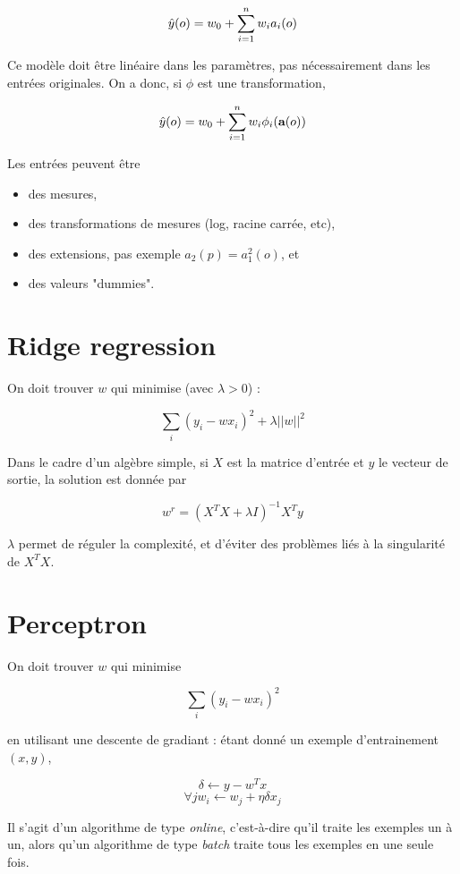 	$$\hat{y}(o) = w_0 + \sum_{i = 1}^n w_i a_i(o)$$
	
	Ce modèle doit être linéaire dans les paramètres, pas nécessairement dans les entrées originales. On a donc, si $\phi$ est une transformation,
	
	$$\hat{y}(o) = w_0 + \sum_{i = 1}^n w_i \phi_i(\textbf{a}(o))$$
	
	Les entrées peuvent être
	
	\begin{itemize}
		\item des mesures,
		\item des transformations de mesures (log, racine carrée, etc),
		\item des extensions, pas exemple $a_2(p) = a^2_1(o)$, et
		\item des valeurs "dummies".
	\end{itemize}
	
	\section{Ridge regression}

	On doit trouver $w$ qui minimise (avec $\lambda > 0$) :

	$$\sum_i (y_i - wx_i)^2 + \lambda \vert \vert w \vert \vert^2$$

	Dans le cadre d'un algèbre simple, si $X$ est la matrice d'entrée et $y$ le vecteur de sortie, la solution est donnée par

	$$w^r = (X^T X + \lambda I)^{-1}X^Ty$$

	$\lambda$ permet de réguler la complexité, et d'éviter des problèmes liés à la singularité de $X^TX$.

	\section{Perceptron}

	On doit trouver $w$ qui minimise

	$$\sum_i (y_i - wx_i)^2$$

	en utilisant une descente de gradiant : étant donné un exemple d'entrainement $(x, y)$,

	$$\delta \leftarrow y - w^Tx$$
	$$\forall jw_i \leftarrow w_j + \eta \delta x_j$$

	Il s'agit d'un algorithme de type \textit{online}, c'est-à-dire qu'il traite les exemples un à un, alors qu'un algorithme de type \textit{batch} traite tous les exemples en une seule fois.

